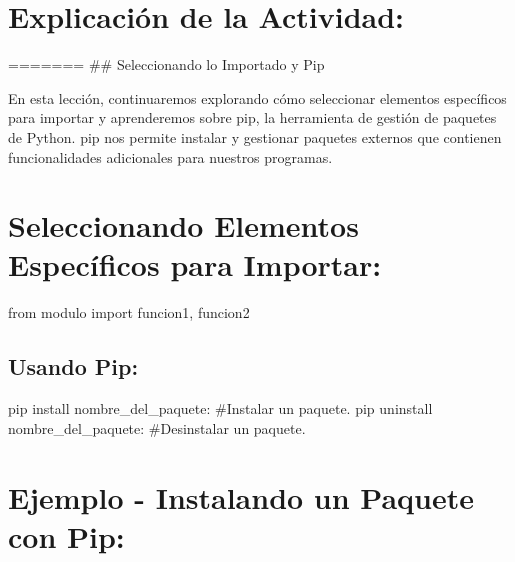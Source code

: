 \documentclass[
  a4paper,
  onepage,
  openany]{scrreprt}
\newenvironment{Shaded}{\begin{snugshade}}{\end{snugshade}}
\newcommand{\CommentTok}[1]{\textcolor[rgb]{0.37,0.37,0.37}{#1}}
\newcommand{\ExtensionTok}[1]{\textcolor[rgb]{0.00,0.23,0.31}{#1}}
\newcommand{\ImportTok}[1]{\textcolor[rgb]{0.00,0.46,0.62}{#1}}
\newcommand{\NormalTok}[1]{\textcolor[rgb]{0.00,0.23,0.31}{#1}}
\begin{document}
\hypertarget{explicaciuxf3n-de-la-actividad-62}{%
\section{Explicación de la
Actividad:}\label{explicaciuxf3n-de-la-actividad-62}}

======= \#\# Seleccionando lo Importado y Pip

En esta lección, continuaremos explorando cómo seleccionar elementos
específicos para importar y aprenderemos sobre pip, la herramienta de
gestión de paquetes de Python. pip nos permite instalar y gestionar
paquetes externos que contienen funcionalidades adicionales para
nuestros programas.

\hypertarget{seleccionando-elementos-especuxedficos-para-importar-3}{%
\section{Seleccionando Elementos Específicos para
Importar:}\label{seleccionando-elementos-especuxedficos-para-importar-3}}

\begin{Shaded}
\begin{Highlighting}[]
\ImportTok{from}\NormalTok{ modulo }\ImportTok{import}\NormalTok{ funcion1, funcion2}
\end{Highlighting}
\end{Shaded}

\hypertarget{usando-pip-1}{%
\subsection{Usando Pip:}\label{usando-pip-1}}

\begin{Shaded}
\begin{Highlighting}[]
\ExtensionTok{pip}\NormalTok{ install nombre\_del\_paquete: }\CommentTok{\#Instalar un paquete.}
\ExtensionTok{pip}\NormalTok{ uninstall nombre\_del\_paquete: }\CommentTok{\#Desinstalar un paquete.}
\end{Highlighting}
\end{Shaded}

\hypertarget{ejemplo---instalando-un-paquete-con-pip-1}{%
\section{Ejemplo - Instalando un Paquete con
Pip:}\label{ejemplo---instalando-un-paquete-con-pip-1}}
\end{document}
